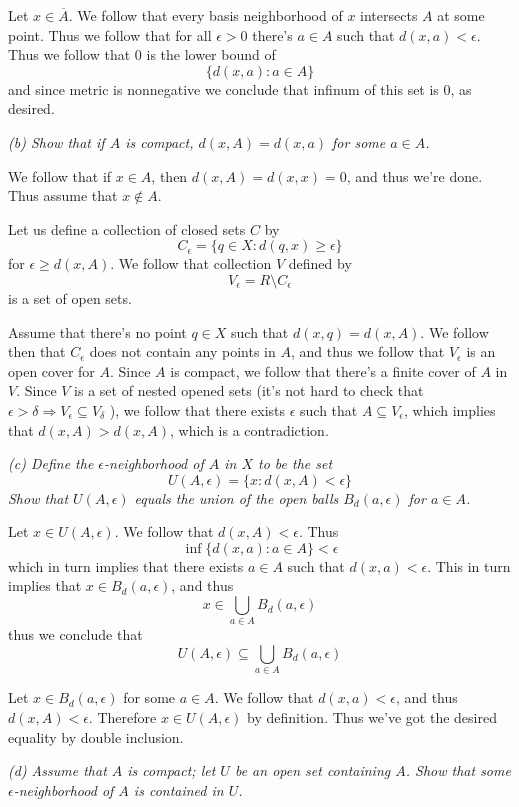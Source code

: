 \documentclass[11pt,oneside,titlepage]{book}
\DeclareMathOperator \ra {\Rightarrow}
\newcommand{\set}[1]{\{ #1 \}}
\begin{document}
Let $x \in \overline{A}$. We follow that every basis neighborhood of $x$ intersects $A$ at some
point. Thus we follow that for all $\epsilon > 0$ there's $a \in A$ such that
$d(x, a) < \epsilon$. Thus we follow that $0$ is the lower bound of
$$\set{d(x, a): a \in A}$$
and since metric is nonnegative we conclude that infinum of this set is $0$, as desired.

\textit{(b) Show that if $A$ is compact, $d(x, A) = d(x, a)$ for some $a \in A$.}

We follow that if $x \in A$, then $d(x, A) = d(x, x) = 0$, and thus we're done. Thus
assume that $x \notin A$.

Let us define a collection of closed sets $C$ by
$$C_\epsilon = \set{q \in X: d(q, x) \geq \epsilon}$$
for $\epsilon \geq d(x, A)$.
We follow that collection $V$ defined by
$$V_\epsilon = R \setminus C_\epsilon$$
is a set of open sets.

Assume that there's no point $q \in X$ such that $d(x, q) = d(x, A)$. 
We follow then that $C_\epsilon$ does not contain any points in $A$, and thus we follow that
$V_\epsilon$ is an open cover for $A$. Since $A$ is compact, we follow that
there's a finite cover of $A$ in $V$. Since $V$ is a set of nested opened sets (it's
not hard to check that $\epsilon > \delta \ra V_\epsilon \subseteq V_\delta$ ), we follow that
there exists $\epsilon$ such that $A \subseteq V_\epsilon$, which implies that
$d(x, A) > d(x, A)$, which is a contradiction.

\textit{(c) Define the $\epsilon$-neighborhood of $A$ in $X$ to be the set
  $$U(A, \epsilon) = \set{x: d(x, A) < \epsilon}$$
  Show that $U(A, \epsilon)$ equals the union of the open balls $B_d(a, \epsilon)$ for
  $a \in A$.}

Let $x \in U(A, \epsilon)$. We follow that $d(x, A) < \epsilon$. Thus
$$\inf\set{d(x, a): a \in A} < \epsilon$$
which in turn implies that there exists $a \in A$ such that $d(x, a) < \epsilon$. This in turn
implies that $x \in B_d(a, \epsilon)$, and thus
$$x \in \bigcup_{a \in A}{B_d(a, \epsilon)}$$
thus we conclude that
$$U(A, \epsilon) \subseteq \bigcup_{a \in A}{B_d(a, \epsilon)}$$

Let $x \in B_d(a, \epsilon)$ for some $a \in A$. We follow that $d(x, a) < \epsilon$,
and thus $d(x, A) < \epsilon$. Therefore  $x \in U(A, \epsilon)$ by definition. Thus
we've got the desired equality by double inclusion.

\textit{(d) Assume that $A$ is compact; let $U$ be an open set containing $A$. Show that
  some $\epsilon$-neighborhood of $A$ is contained in $U$.}
\end{document}

